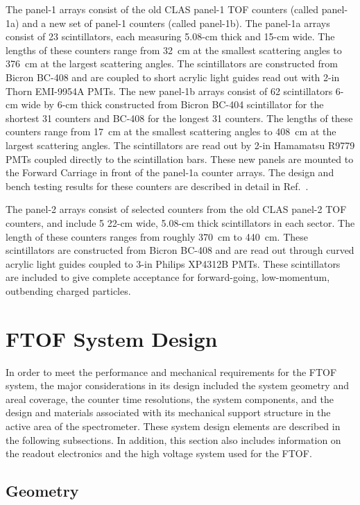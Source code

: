 \documentclass[3p,times,twocolumn]{elsarticle}
\begin{document}
The panel-1 arrays consist of the old CLAS panel-1 TOF counters (called panel-1a) and a new set of panel-1
counters (called panel-1b).  The panel-1a arrays consist of 23 scintillators, each measuring 5.08-cm thick
and 15-cm wide.  The lengths of these counters range from 32~cm at the smallest scattering angles to
376~cm at the largest scattering angles.  The scintillators are constructed from Bicron BC-408 and are
coupled to short acrylic light guides read out with 2-in Thorn EMI-9954A PMTs.  The new panel-1b arrays
consist of 62 scintillators 6-cm wide by 6-cm thick constructed from Bicron BC-404 scintillator for the
shortest 31 counters and BC-408 for the longest 31 counters. The lengths of these counters range from
17~cm at the smallest scattering angles to 408~cm at the largest scattering angles. The scintillators are
read out by 2-in Hamamatsu R9779 PMTs coupled directly to the scintillation bars. These new panels are
mounted to the Forward Carriage in front of the panel-1a counter arrays. The design and bench testing
results for these counters are described in detail in Ref.~\cite{nim-p1b}.

The panel-2 arrays consist of selected counters from the old CLAS panel-2 TOF counters, and include 5
22-cm wide, 5.08-cm thick scintillators in each sector.  The length of these counters ranges from roughly
370~cm to 440~cm.  These scintillators are constructed from Bicron BC-408 and are read out through
curved acrylic light guides coupled to 3-in Philips XP4312B PMTs. These scintillators are included to give
complete acceptance for forward-going, low-momentum, outbending charged particles.  

\section{FTOF System Design}
\label{sec:design}

In order to meet the performance and mechanical requirements for the FTOF system, the major
considerations in its design included the system geometry and areal coverage, the counter time resolutions,
the system components, and the design and materials associated with its mechanical support structure in
the active area of the spectrometer. These system design elements are described in the following
subsections. In addition, this section also includes information on the readout electronics and the high
voltage system used for the FTOF.

\subsection{Geometry}
\label{ftof-geometry}
\end{document}

